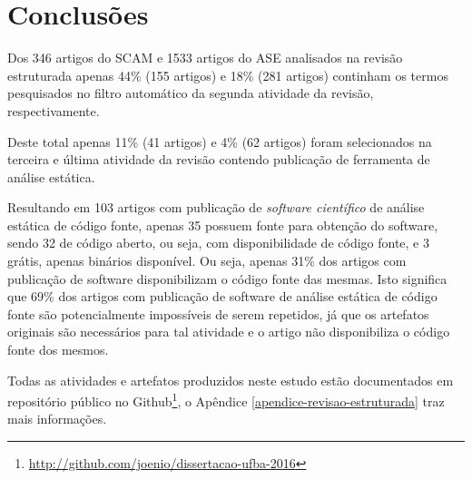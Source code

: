 \section{Conclusões}

Dos 346 artigos do SCAM e 1533 artigos do ASE analisados na revisão estruturada
apenas 44\% (155 artigos) e 18\% (281 artigos) continham os termos pesquisados
no filtro automático da segunda atividade da revisão, respectivamente.

Deste total apenas 11\% (41 artigos) e 4\% (62 artigos) foram selecionados na
terceira e última atividade da revisão contendo publicação de ferramenta de
análise estática.

Resultando em 103 artigos com publicação de {\it software científico} de
análise estática de código fonte, apenas 35 possuem fonte para obtenção do
software, sendo 32 de código aberto, ou seja, com disponibilidade de
código fonte, e 3 grátis, apenas binários disponível. Ou seja, apenas 31\% dos
artigos com publicação de software disponibilizam o código fonte das mesmas.
Isto significa que 69\% dos artigos com publicação de software de análise
estática de código fonte são potencialmente impossíveis de serem repetidos, já
que os artefatos originais são necessários para tal atividade e o artigo não
disponibiliza o código fonte dos mesmos.

Todas as atividades e artefatos produzidos neste estudo estão documentados em
repositório público no
Github\footnote{\url{http://github.com/joenio/dissertacao-ufba-2016}}, o
Apêndice \ref{apendice-revisao-estruturada} traz mais informações.
